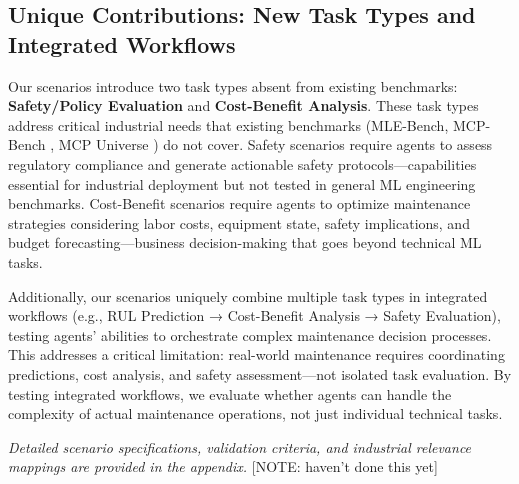 \documentclass[conference]{IEEEtran}
\begin{document}
\subsection{Unique Contributions: New Task Types and Integrated Workflows}

Our scenarios introduce two task types absent from existing benchmarks: \textbf{Safety/Policy Evaluation} and \textbf{Cost-Benefit Analysis}. These task types address critical industrial needs that existing benchmarks (MLE-Bench, MCP-Bench \cite{wang2025mcpbench}, MCP Universe \cite{luo2025mcpuniverse}) do not cover. Safety scenarios require agents to assess regulatory compliance and generate actionable safety protocols—capabilities essential for industrial deployment but not tested in general ML engineering benchmarks. Cost-Benefit scenarios require agents to optimize maintenance strategies considering labor costs, equipment state, safety implications, and budget forecasting—business decision-making that goes beyond technical ML tasks.

Additionally, our scenarios uniquely combine multiple task types in integrated workflows (e.g., RUL Prediction → Cost-Benefit Analysis → Safety Evaluation), testing agents' abilities to orchestrate complex maintenance decision processes. This addresses a critical limitation: real-world maintenance requires coordinating predictions, cost analysis, and safety assessment—not isolated task evaluation. By testing integrated workflows, we evaluate whether agents can handle the complexity of actual maintenance operations, not just individual technical tasks.

\textit{Detailed scenario specifications, validation criteria, and industrial relevance mappings are provided in the appendix.} [NOTE: haven't done this yet]
\end{document}
